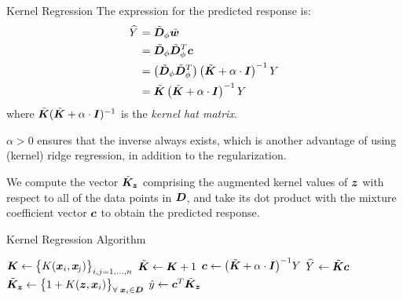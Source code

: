 \begin{frame}{Kernel Regression}
The expression for the
predicted response is:
\begin{align*}
    \hY & = \abD_\phi \abw \notag\\
     & = \abD_\phi \abD_\phi^T \bc \notag\\
     & = \lB(\abD_\phi \abD_\phi^T\rB) \lB(\abK + \alpha \cdot \bI\rB)^{-1} Y \notag\\
     & = \abK \lB(\abK + \alpha \cdot \bI\rB)^{-1} Y
\end{align*}
where $\abK (\abK + \alpha \cdot \bI)^{-1}$ is the {\em kernel hat
    matrix}.

\medskip

    $\alpha > 0$ ensures that  the inverse always
    exists, which is another advantage of using (kernel) ridge
    regression, in addition to the regularization.
%

\medskip

We compute the vector $\abK_{\bz}$ comprising the augmented
kernel values of $\bz$ with respect to
all of the data points in $\bD$,  
and take its dot product with the mixture
coefficient vector $\bc$ to obtain the predicted response.
\end{frame}
%
%
\begin{frame}{Kernel Regression Algorithm}
\begin{tightalgo}[H]{\textwidth-18pt}
\Algorithm{} 
$\bK \assign \bigl\{K(\bx_i, \bx_{\!j})\bigr\}_{i,j=1,\ldots,n}$
\;
$\abK \assign \bK+1$\;
$\bc \assign \bigl( \abK + \alpha \cdot \bI \bigr)^{-1} Y$ \;
$\hY \assign \abK \bc$\;
\BlankLine
{}
\Algorithm{} 
$\abK_{\bz} \assign \bigl\{1 + K(\bz, \bx_i)\bigr\}_{\forall\; \bx_i \in
\bD}$\;
$\hy \assign \bc^T\abK_{\bz}$\;
\end{tightalgo}
\end{frame}
